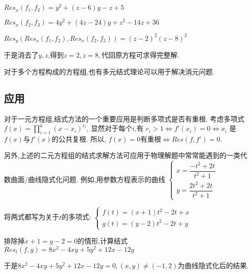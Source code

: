 	$ Res_x(f_1,f_2) = y^2+(z-6)y-z+5 $ 

	$ Res_x(f_2,f_3)=4y^2+(4z-24)y + z^2-14z+36$

	$ Res_y(Res_x(f_1,f_2),Res_x(f_2,f_3)) = (z-2)^2(z-8)^2$

	于是消去了$ y,z$,得到$ z=2,z=8,$代回原方程可求得完整解.

	对于多个方程构成的方程组,也有多元结式理论可以用于解决消元问题.\cite{ideals}

\subsection{应用}
	对于一元方程组,结式方法的一个重要应用是判断多项式是否有重根.
	考虑多项式$ f(x) = \prod_{i=1}^{k}{(x-x_i)^{r_i}}$,
	显然对于每个$ i$,有 $ r_i >1 \Leftrightarrow  f'(x_i) = 0 \Leftrightarrow x_i $ 是$f(x)$与$ f'(x)$的公共复根.
	所以, $ f(x)=0$有重根$ \Leftrightarrow Res(f,f')=0$.
	
	\vspace{5pt}
	另外,上述的二元方程组的结式求解方法可应用于物理解题中常常能遇到的一类代数曲面/曲线隐式化问题.
	例如,用参数方程表示的曲线
	$ \begin{cases}x=\dfrac{-t^2+2t}{t^2+1} \\ y=\dfrac{2t^2+2t}{t^2+1} \end{cases}$

	将两式都写为关于$ t$的多项式: 
	$\begin{cases}f(t)=(x+1)t^2 -2t +x\\ g(t)=(y-2)t^2-2t+y \end{cases}$

	\vspace{5pt}
	排除掉$ x+1=y-2=0$的情形,计算结式$ Res_t(f,g)= 8x^2-4xy+5y^2+12x-12y$ 
	
	于是$8x^2-4xy+5y^2+12x-12y=0,(x,y) \ne (-1,2)$为曲线隐式化后的结果.
